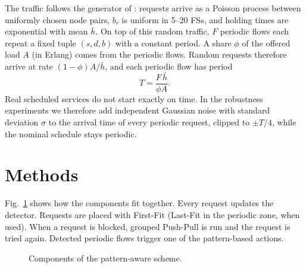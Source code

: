 \documentclass[preprint,12pt]{elsarticle}
\begin{document}
The traffic follows the generator of \cite{malayeri2022}: requests arrive as a Poisson process between uniformly chosen node pairs, $b_r$ is uniform in 5--20 FSs, and holding times are exponential with mean $\bar{h}$. On top of this random traffic, $F$ periodic flows each repeat a fixed tuple $(s,d,b)$ with a constant period. A share $\phi$ of the offered load $A$ (in Erlang) comes from the periodic flows. Random requests therefore arrive at rate $(1-\phi)A/\bar{h}$, and each periodic flow has period
\begin{equation}
T = \frac{F\,\bar{h}}{\phi A}.
\end{equation}
Real scheduled services do not start exactly on time. In the robustness experiments we therefore add independent Gaussian noise with standard deviation $\sigma$ to the arrival time of every periodic request, clipped to $\pm T/4$, while the nominal schedule stays periodic.

\section{Methods}\label{sec:method}
Fig.~\ref{fig:pipeline} shows how the components fit together. Every request updates the detector. Requests are placed with First-Fit (Last-Fit in the periodic zone, when used). When a request is blocked, grouped Push-Pull is run and the request is tried again. Detected periodic flows trigger one of the pattern-based actions.

\begin{figure}[t]
\centering
{}
\caption{Components of the pattern-aware scheme.}
\label{fig:pipeline}
\end{figure}
\end{document}
